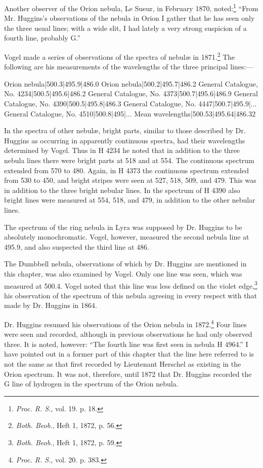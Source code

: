 \documentclass[a4paper, 12pt, oneside, polutonikogreek, english]{article}
\begin{document}
Another observer of the Orion nebula, Le Sueur, in February 1870, noted:\footnote{\emph{Proc. R. S.}, vol. 19. p. 18.} ``From Mr. Huggins's observations of the nebula in Orion I gather that he has seen only the three usual lines; with a wide slit, I had lately a very strong suspicion of a fourth line, probably G.'' 

Vogel made a series of observations of the spectra of nebulæ in 1871.\footnote{\emph{Both. Beob.}, Heft 1, 1872, p. 56.} The following are his measurements of the wavelengths of the three principal lines:---

Orion nebula|500.3|495.9|486.0 
Orion nebula|500.2|495.7|486.2 
General Catalogue, No. 4234|500.5|495.6|486.2 
General Catalogue, No. 4373|500.7|495.6|486.9 
General Catalogue, No. 4390|500.5|495.8|486.3 
General Catalogue, No. 4447|500.7|495.9|... 
General Catalogue, No. 4510|500.8|495|... 
Mean wavelengths|500.53|495.64|486.32 

In the spectra of other nebulæ, bright parts, similar to those described by Dr. Huggins as occurring in apparently continuous spectra, had their wavelengths determined by Vogel. Thus in H 4234 he noted that in addition to the three nebula lines there were bright parts at 518 and at 554. The continuous spectrum extended from 570 to 480. Again, in H 4373 the continuous spectrum extended from 530 to 450, and bright stripes were seen at 527, 518, 509, and 479. This was in addition to the three bright nebular lines. In the spectrum of H 4390 also bright lines were measured at 554, 518, and 479, in addition to the other nebular lines.

The spectrum of the ring nebula in Lyra was supposed by Dr. Huggins to be absolutely monochromatic. Vogel, however, measured the second nebula line at 495.9, and also suspected the third line at 486.

The Dumbbell nebula, observations of which by Dr. Huggins are mentioned in this chapter, was also examined by Vogel. Only one line was seen, which was measured at 500.4. Vogel noted that this line was less defined on the violet edge,\footnote{\emph{Both. Beob.}, Heft 1, 1872, p. 59.} his observation of the spectrum of this nebula agreeing in every respect with that made by Dr. Huggins in 1864.

Dr. Huggins resumed his observations of the Orion nebula in 1872.\footnote{\emph{Proc. R. S.}, vol. 20. p. 383.} Four lines were seen and recorded, although in previous observations he had only observed three. It is noted, however: ``The fourth line was first seen in nebula H 4964.'' I have pointed out in a former part of this chapter that the line here referred to is not the same as that first recorded by Lieutenant Herschel as existing in the Orion spectrum. It was not, therefore, until 1872 that Dr. Huggins recorded the G line of hydrogen in the spectrum of the Orion nebula.
\end{document}
